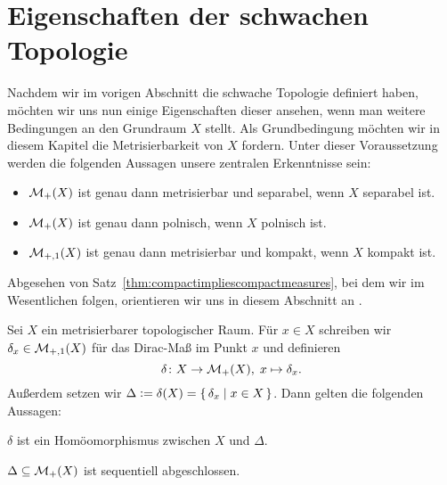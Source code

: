 \documentclass[../main/main.tex]{subfiles}
\begin{document}
	
	\section{Eigenschaften der schwachen Topologie}
	
	Nachdem wir im vorigen Abschnitt die schwache Topologie definiert haben, möchten wir uns nun einige Eigenschaften dieser ansehen, wenn man weitere Bedingungen an den Grundraum $X$ stellt. 
	Als Grundbedingung möchten wir in diesem Kapitel die Metrisierbarkeit von $X$ fordern.
	Unter dieser Voraussetzung werden die folgenden Aussagen unsere zentralen Erkenntnisse sein:
	\begin{itemize}
		\item $\mathcal{M}_{+}(X)$ ist genau dann metrisierbar und separabel, wenn $X$ separabel ist.
		\item $\mathcal{M}_{+}(X)$ ist genau dann polnisch, wenn $X$ polnisch ist.
		\item $\mathcal{M}_{+,1}(X)$ ist genau dann metrisierbar und kompakt, wenn $X$ kompakt ist.
	\end{itemize}
	Abgesehen von Satz~\ref{thm:compactimpliescompactmeasures}, bei dem wir im Wesentlichen \cite{vanGaans.200203} folgen, orientieren wir uns in diesem Abschnitt an \cite{Varadarajan.1958}.
	
	\begin{Satz}
		\label{thm:embeddingdiracmeasures}
		Sei $X$ ein metrisierbarer topologischer Raum. Für $x \in X$ schreiben wir $\delta_x \in \mathcal{M}_{+,1}(X)$ für das Dirac-Maß im Punkt $x$ und definieren
		\[ \delta \colon X \to \mathcal{M}_{+}(X), \; x \mapsto \delta_x  \text{.} \]
		Außerdem setzen wir $\Delta \vcentcolon = \delta(X) = \left\{\, \delta_x \; \middle| \; x \in X \,\right\}$. Dann gelten die folgenden Aussagen:
		\begin{enumeratethm}
			\item $\delta$ ist ein Homöomorphismus zwischen $X$ und $\Delta$.
			\item $\Delta \subseteq \mathcal{M}_{+}(X)$ ist sequentiell abgeschlossen.
		\end{enumeratethm}
	\end{Satz}
\end{document}
